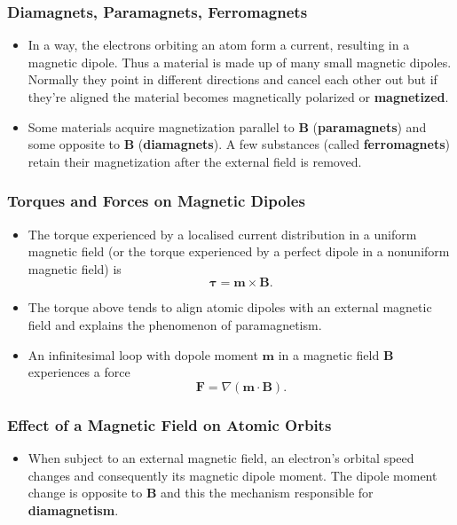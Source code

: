 \documentclass{article}
\renewcommand{\vec}[1]{\boldsymbol{\mathbf{#1}}}
\begin{document}
\subsubsection{Diamagnets, Paramagnets, Ferromagnets}

\begin{itemize}
  \item In a way, the electrons orbiting an atom form a current, resulting in a magnetic dipole. Thus a material is made up of many small magnetic dipoles. Normally they point in different directions and cancel each other out but if they're aligned the material becomes magnetically polarized or \textbf{magnetized}.

  \item Some materials acquire magnetization parallel to $\vec{B}$ (\textbf{paramagnets}) and some opposite to $\vec{B}$ (\textbf{diamagnets}). A few substances (called \textbf{ferromagnets}) retain their magnetization after the external field is removed.
\end{itemize}

\subsubsection{Torques and Forces on Magnetic Dipoles}

\begin{itemize}
  \item The torque experienced by a localised current distribution in a uniform magnetic field (or the torque experienced by a perfect dipole in a nonuniform magnetic field) is \[\vec{\tau} = \vec{m} \times \vec{B}.\]

  \item The torque above tends to align atomic dipoles with an external magnetic field and explains the phenomenon of paramagnetism.

  \item An infinitesimal loop with dopole moment $\vec{m}$ in a magnetic field $\vec{B}$ experiences a force \[\vec{F} = \nabla (\vec{m} \cdot \vec{B}).\]
\end{itemize}

\subsubsection{Effect of a Magnetic Field on Atomic Orbits}

\begin{itemize}
  \item When subject to an external magnetic field, an electron's orbital speed changes and consequently its magnetic dipole moment. The dipole moment change is opposite to $\vec{B}$ and this the mechanism responsible for \textbf{diamagnetism}.
\end{itemize}
\end{document}
